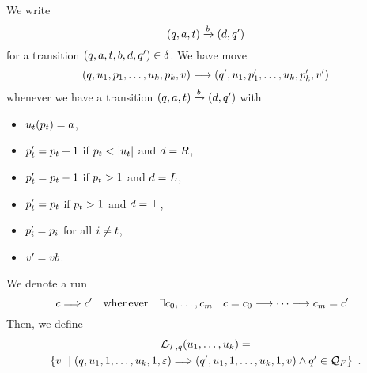 We write
\[
    \left(q,a,t\right) \xrightarrow{b} \left(d,q'\right)
\]
for a transition
$\left(q, a, t, b, d, q'\right) \in \delta$.
We have move
\[
    \left(
        q,
        u_1, p_1,
        \ldots,
        u_k, p_k,
        v
    \right)
    \longrightarrow
    \left(
        q',
        u_1, p'_1,
        \ldots,
        u_k, p'_k,
        v'
    \right)
\]
whenever we have a transition
$\left(q,a,t\right) \xrightarrow{b} \left(d,q'\right)$
with
\begin{itemize}
\item
    ${u_t}\mathord{\left(p_t\right)} = a$,
\item
    $p'_t = p_t + 1$
        if $p_t < \left|u_t\right|$
        and $d = R$,
\item
    $p'_t = p_t - 1$
        if $p_t > 1$
        and $d = L$,
\item
    $p'_t = p_t$
        if $p_t > 1$
        and $d = \bot$,
\item
    $p'_i = p_i$
        for all $i \neq t$,
\item
    $v' = v b$.
\end{itemize}
We denote a run
\[
    \tconfig \trun \tconfig'
    \quad
    \text{whenever}
    \quad
    \exists
        \tconfig_0, \ldots, \tconfig_\runlen \ .\ %
    \tconfig = \tconfig_0 \tmove \cdots \tmove \tconfig_\runlen = \tconfig' \ .
\]
Then, we define
\begin{multline*}
    {\mathcal{L}_{\mathcal{T},q}}\mathord{\left(u_1, \ldots, u_k\right)}
    = \\
    \left\{{v}\ \mid {
        \left(
            q,
            u_1, 1,
            \ldots,
            u_k, 1,
            \varepsilon
        \right)
        \Longrightarrow\left(
            q',
            u_1, 1,
            \ldots,
            u_k, 1,
            v\right)
        \land
        q' \in \mathcal{Q}_F}\right\} \ .
\end{multline*}


